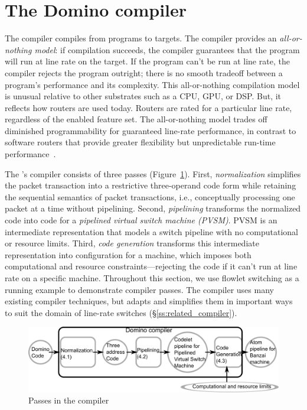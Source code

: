 \section{The Domino compiler}
\label{s:compiler}

The \pktlanguage compiler compiles from \pktlanguage programs to \absmachine
targets. The compiler provides an {\em all-or-nothing model}: if compilation
succeeds, the compiler guarantees that the program will run at line rate on the
target. If the program can't be run at line rate, the compiler rejects the
program outright; there is no smooth tradeoff between a program's performance
and its complexity.  This all-or-nothing compilation model is unusual relative
to other substrates such as a CPU, GPU, or DSP. But, it reflects how routers
are used today. Routers are rated for a particular line rate, regardless of the
enabled feature set. The all-or-nothing model trades off diminished
programmability for guaranteed line-rate performance, in contrast to software
routers that provide greater flexibility but unpredictable run-time
performance~\cite{dobrescu2012, wenfei15}.

The \pktlanguage's compiler consists of three passes (Figure~\ref{fig:passes}).
First, \textit{normalization} simplifies the packet transaction into a
restrictive three-operand code form while retaining the sequential semantics of
packet transactions, i.e., conceptually processing one packet at a time without
pipelining. Second, \textit{pipelining} transforms the normalized code into
code for a \textit{pipelined virtual switch machine (PVSM)}. PVSM is an
intermediate representation that models a switch pipeline with no computational
or resource limits. Third, \textit{code generation} transforms this
intermediate representation into configuration for a \absmachine machine, which
imposes both computational and resource constraints---rejecting the code if it
can't run at line rate on a specific \absmachine machine. Throughout this
section, we use flowlet switching as a running example to demonstrate compiler
passes. The \pktlanguage compiler uses many existing compiler techniques, but
adapts and simplifies them in important ways to suit the domain of line-rate
switches (\S\ref{ss:related_compiler}).

\begin{figure}[!t]
  \includegraphics[width=\columnwidth]{compiler.pdf}
  \caption{Passes in the \pktlanguage compiler}
  \label{fig:passes}
\end{figure}

